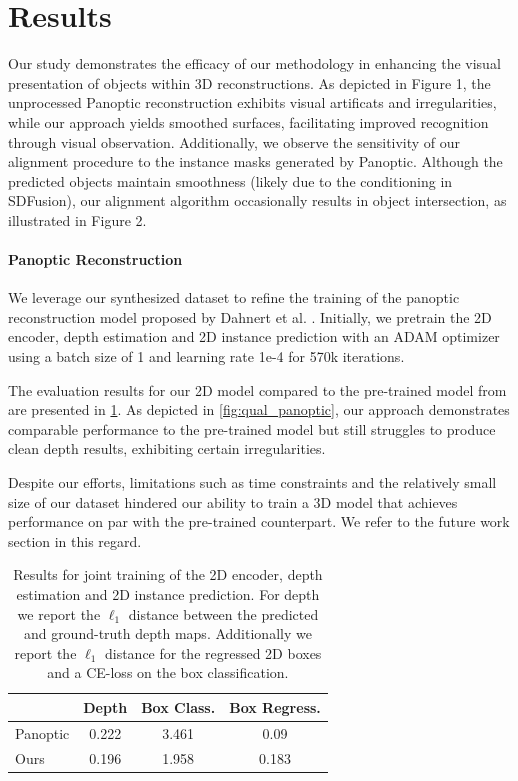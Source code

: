 \section{Results}
\label{sec:results}
Our study demonstrates the efficacy of our methodology in enhancing the visual presentation of objects within 3D reconstructions. As depicted in Figure 1, the unprocessed Panoptic reconstruction exhibits visual artificats and irregularities, while our approach yields smoothed surfaces, facilitating improved recognition through visual observation. Additionally, we observe the sensitivity of our alignment procedure to the instance masks generated by Panoptic. Although the predicted objects maintain smoothness (likely due to the conditioning in SDFusion), our alignment algorithm occasionally results in object intersection, as illustrated in Figure 2.

\paragraph{Panoptic Reconstruction}

We leverage our synthesized dataset to refine the training of the panoptic reconstruction model proposed by Dahnert et al. \citep{dahnert2021panoptic}.
Initially, we pretrain the 2D encoder, depth estimation and 2D instance prediction with an ADAM optimizer using a batch size of 1 and learning rate 1e-4 for 570k iterations.

The evaluation results for our 2D model compared to the pre-trained model from \citet{dahnert2021panoptic} are presented in \cref{tab:2dresults}.
As depicted in \cref{fig:qual_panoptic}, our approach demonstrates comparable performance to the pre-trained model but still struggles to produce clean depth results, exhibiting certain irregularities.

Despite our efforts, limitations such as time constraints and the relatively small size of our dataset hindered our ability to train a 3D model that achieves performance on par with the pre-trained counterpart. We refer to the future work section in this regard.
\begin{table}
  \centering
  \begin{tabular}{@{}lccc@{}}
    \toprule
     & Depth & Box Class. & Box Regress. \\
    \midrule
    Panoptic & 0.222 & 3.461 & 0.09\\
    Ours & 0.196 & 1.958 & 0.183 \\
    \bottomrule
  \end{tabular}
  \caption{Results for joint training of the 2D encoder, depth estimation and 2D instance prediction. For depth we report the $\ell_1$ distance between the predicted and ground-truth depth maps. Additionally we report the $\ell_1$ distance for the regressed 2D boxes and a CE-loss on the box classification.  }
  \label{tab:2dresults}
\end{table}

